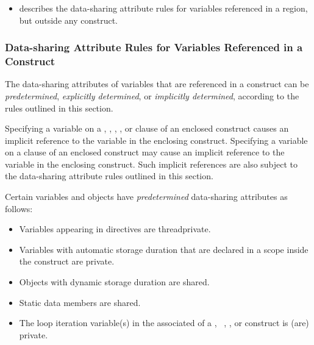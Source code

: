 {{{{\begin{itemize}
\item {} describes the data-sharing attribute rules for variables 
referenced in a region, but outside any construct. 
\end{itemize}









\subsubsection{Data-sharing Attribute Rules for Variables Referenced in a Construct}
\label{subsubsec:Data-sharing Attribute Rules for Variables Referenced in a Construct}
The data-sharing attributes of variables that are referenced in a construct can be 
\emph{predetermined}, \emph{explicitly determined}, or \emph{implicitly determined}, according to the rules 
outlined in this section.

Specifying a variable on a , , , , 
or  clause of an enclosed construct causes an implicit reference to the 
variable in the enclosing construct. Specifying a variable on a  clause of an enclosed 
construct may cause an implicit reference to the variable in the enclosing construct. 
Such implicit references are also subject to the data-sharing attribute rules outlined in 
this section.

Certain variables and objects have \emph{predetermined} data-sharing attributes as follows:

\ccppspecificstart
\begin{itemize}
\item Variables appearing in  directives are threadprivate.

\item Variables with automatic storage duration that are declared in a scope inside the 
construct are private. 

\item Objects with dynamic storage duration are shared.

\item Static data members are shared.

\item The loop iteration variable(s) in the associated  of a
, ~, , or  construct is (are) private.


\end{itemize}}}}}
